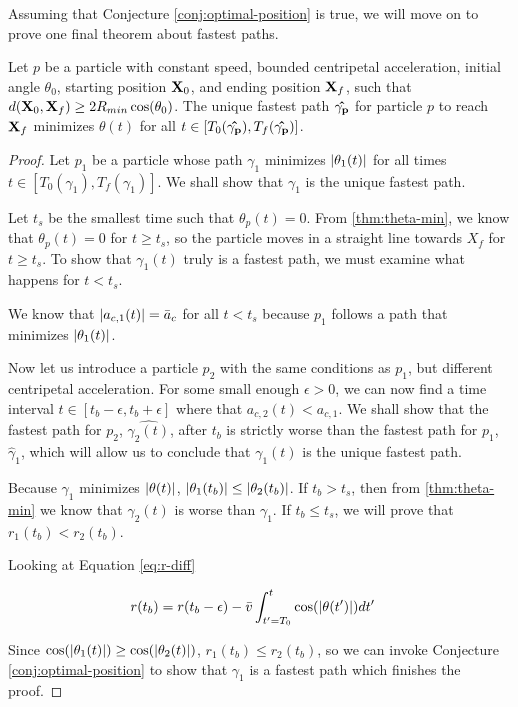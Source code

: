 Assuming that Conjecture \ref{conj:optimal-position} is true, we will move on to prove one final theorem about fastest paths.

\begin{theorem}
  Let  $p$ be a particle with constant speed, bounded centripetal acceleration, initial angle $\theta_0$, starting position $\mathbf{X}_0$, and ending position $\mathbf{X}_f$, such that $d(\bvec{X}_0, \bvec{X}_f) \ge 2 R_{min} \cos\paren{\theta_0}$. The unique fastest path $\mathbf{\hat{\gamma_p}}$ for particle $p$ to reach $\mathbf{X}_f$ minimizes $\theta(t)$ for all $t \in [T_0(\mathbf{\hat{\gamma_p}}), T_f(\mathbf{\hat{\gamma_p}})]$.
  \label{thm:restricted-theta}
\end{theorem}
\begin{proof}
Let $p_1$ be a particle whose path $\gamma_1$ minimizes $\abs{\theta_1(t)}$ for all times $t \in [T_0(\gamma_1), T_f(\gamma_1)]$. We shall show that $\gamma_1$ is the unique fastest path.

Let $t_s$ be the smallest time such that $\theta_p(t) = 0$. From \ref{thm:theta-min}, we know that $\theta_p(t) = 0$ for $t \ge t_s$, so the particle moves in a straight line towards $X_f$ for $t \ge t_s$. To show that $\gamma_1(t)$ truly is a fastest path, we must examine what happens for $t < t_s$.

We know that $\abs{a_{c,1}(t)} = \bar{a}_c$ for all $t < t_s$ because $p_1$ follows a path that minimizes $\abs{\theta_1(t)}$.

Now let us introduce a particle $p_2$ with the same conditions as $p_1$, but different centripetal acceleration. For some small enough $\epsilon > 0$, we can now find a time interval $t \in [t_b-\epsilon, t_b+\epsilon]$ where that $a_{c,2}(t) < a_{c,1}$.  We shall show that the fastest path for $p_2$, $\hat{\gamma_2(t)}$, after $t_b$ is strictly worse than the fastest path for $p_1$, $\hat{\gamma}_1$, which will allow us to conclude that $\gamma_1(t)$ is the unique fastest path.

Because $\gamma_1$ minimizes $\abs{\theta(t)}$, $\abs{\theta_1(t_b)} \le \abs{\theta_2(t_b)}$. If $t_b > t_s$, then from \ref{thm:theta-min} we know that $\gamma_2(t)$ is worse than $\gamma_1$. If $t_b \le t_s$, we will prove that $r_1(t_b) < r_2(t_b)$. 

Looking at Equation \ref{eq:r-diff}

\begin{align*}
  r(t_b)& = r(t_b-\epsilon) - \bar{v} \int_{t' = T_0}^{t} \cos(\abs{\theta(t')}) dt'
\end{align*}

Since $\cos(\abs{\theta_1(t)}) \ge \cos(\abs{\theta_2(t)})$, $r_1(t_b) \le r_2(t_b)$, so we can invoke Conjecture \ref{conj:optimal-position} to show that $\gamma_1$ is a fastest path which finishes the proof.
\end{proof}